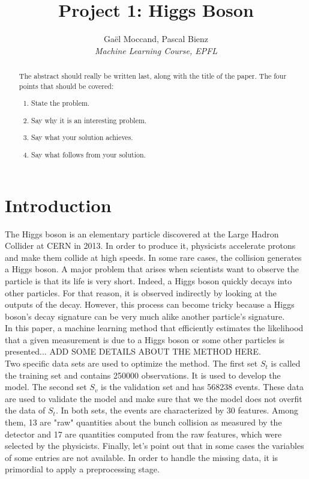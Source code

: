 \documentclass[10pt,conference,compsocconf]{IEEEtran}
\begin{document}
\title{Project 1: Higgs Boson}

\author{
  Gaël Moccand, Pascal Bienz\\
  \textit{Machine Learning Course, EPFL}
}

\maketitle

\begin{abstract}
The abstract should really be written last, along with the title of
the paper. The four points that should be covered:
\begin{enumerate}
\item State the problem.
\item Say why it is an interesting problem.
\item Say what your solution achieves.
\item Say what follows from your solution.
\end{enumerate}
\end{abstract}

\section{Introduction}
The Higgs boson is an elementary particle discovered at the Large Hadron Collider at CERN in 2013. In order to produce it, physicists accelerate protons and make them collide at high speeds. In some rare cases, the collision generates a Higgs boson. A major problem that arises when scientists want to observe the particle is that its life is very short. Indeed, a Higgs boson quickly decays into other particles. For that reason, it is observed indirectly by looking at the outputs of the decay. However, this process can become tricky because a Higgs boson's decay signature can be very much alike another particle's signature.\\
In this paper, a machine learning method that efficiently estimates the likelihood that a given measurement is due to a Higgs boson or some other particles is presented... ADD SOME DETAILS ABOUT THE METHOD HERE.\\
Two specific data sets are used to optimize the method. The first set $S_{t}$ is called the training set and contains 250000 observations. It is used to develop the model. The second set $S_{v}$ is the validation set and has 568238 events. These data are used to validate the model and make sure that we the model does not overfit the data of $S_t$. In both sets, the events are characterized by 30 features. Among them, 13 are "raw" quantities about the bunch collision as measured by the detector and 17 are quantities computed from the raw features, which were selected by the physicists. Finally, let's point out that in some cases the variables of some entries are not available. In order to handle the missing data, it is primordial to apply a preprocessing stage.
\end{document}
